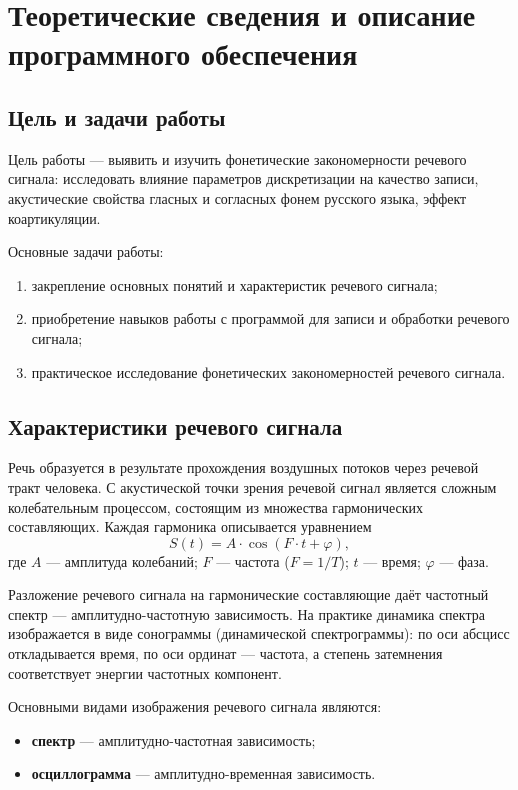 \section{Теоретические сведения и описание программного обеспечения}

\subsection{Цель и задачи работы}

Цель работы --- выявить и изучить фонетические закономерности речевого
сигнала: исследовать влияние параметров дискретизации на качество записи,
акустические свойства гласных и согласных фонем русского языка, эффект
коартикуляции.

Основные задачи работы:
\begin{enumerate}
	\item закрепление основных понятий и характеристик речевого сигнала;
	\item приобретение навыков работы с программой для записи и обработки
		речевого сигнала;
	\item практическое исследование фонетических закономерностей речевого
		сигнала.
\end{enumerate}

\subsection{Характеристики речевого сигнала}

Речь образуется в результате прохождения воздушных потоков через речевой
тракт человека. С акустической точки зрения речевой сигнал является
сложным колебательным процессом, состоящим из множества гармонических
составляющих. Каждая гармоника описывается уравнением
\begin{equation}
	S(t) = A \cdot \cos(F \cdot t + \varphi),
\end{equation}
где $A$ --- амплитуда колебаний; $F$ --- частота ($F = 1/T$); $t$ --- время;
$\varphi$ --- фаза.

Разложение речевого сигнала на гармонические составляющие даёт частотный
спектр --- амплитудно-частотную зависимость. На практике динамика спектра
изображается в виде сонограммы (динамической спектрограммы): по оси
абсцисс откладывается время, по оси ординат --- частота, а степень
затемнения соответствует энергии частотных компонент.

Основными видами изображения речевого сигнала являются:
\begin{itemize}
	\item \textbf{спектр} --- амплитудно-частотная зависимость;
	\item \textbf{осциллограмма} --- амплитудно-временная зависимость.
\end{itemize}

